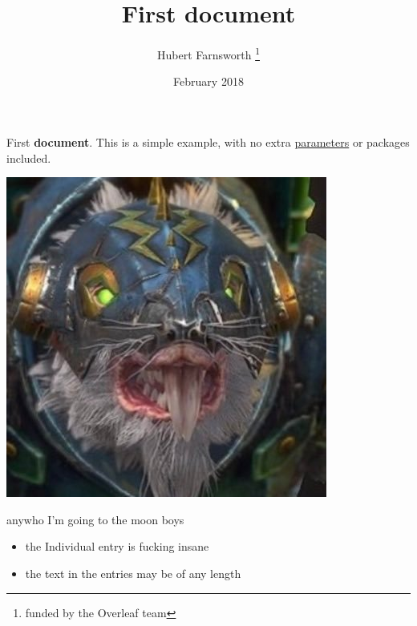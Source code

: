 \documentclass[24pt, letterpaper]{article}
\title{First document}
\author{Hubert Farnsworth \thanks{funded by the Overleaf team}}
\date{February 2018}
\begin{document}
\maketitle
First \textbf{document}. This is a simple example, with no
extra \underline{parameters} or packages included.

\includegraphics{blah}

anywho I'm going to the moon boys

\begin{itemize}
	\item the Individual entry is fucking insane
	\item the text in the entries may be of any length
\end{itemize}

\end{document}
